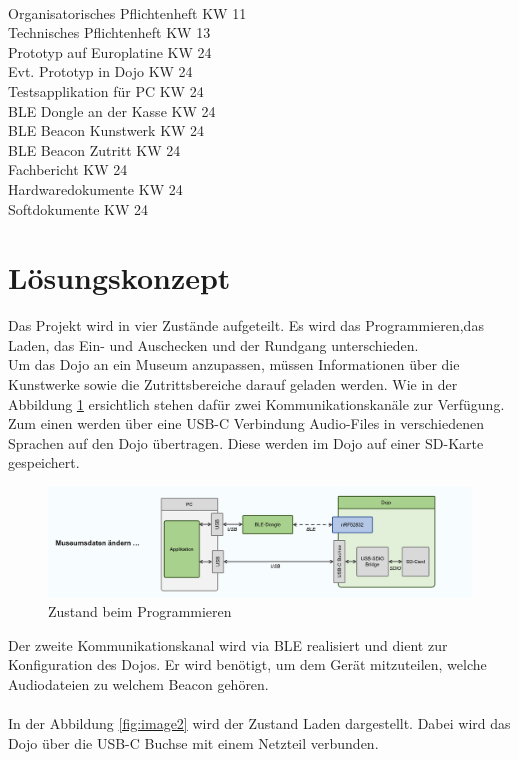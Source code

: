\documentclass[10pt,a4paper,oneside]{99_fhnwreport}
\begin{document}
\begin{tabbing}
\hspace{80mm}		\= 	\\ %
Organisatorisches Pflichtenheft		\>	KW 11 \\
Technisches Pflichtenheft		\>	KW 13 \\
Prototyp auf Europlatine		\>	KW 24 \\
Evt. Prototyp in Dojo			\>	KW 24 \\
Testsapplikation für PC			\>	KW 24 \\
BLE Dongle  an der Kasse			\>	KW 24 \\
BLE Beacon Kunstwerk			\>	KW 24 \\
BLE Beacon Zutritt			\>	KW 24 \\
Fachbericht				\>	KW 24 \\
Hardwaredokumente			\>	KW 24 \\
Softdokumente				\>	KW 24 \\
\end{tabbing}

\section{Lösungskonzept}\label{sec:konzept}

Das Projekt wird in vier Zustände aufgeteilt. Es wird das Programmieren,das Laden, das Ein- und Auschecken und der Rundgang unterschieden.\\
Um das Dojo an ein Museum anzupassen, müssen Informationen über die Kunstwerke sowie die Zutrittsbereiche darauf geladen werden. Wie in der Abbildung \ref{fig:image3} ersichtlich stehen dafür zwei Kommunikationskanäle zur Verfügung. Zum einen werden über eine USB-C Verbindung Audio-Files in verschiedenen Sprachen auf den Dojo übertragen. Diese werden im Dojo auf einer SD-Karte gespeichert.\\

\begin{figure}[htb]
\includegraphics[width=\textwidth]{Zustand_Programmieren.png}
\caption{Zustand beim Programmieren} %
\label{fig:image3}
\end{figure}
\newpage
Der zweite Kommunikationskanal wird via BLE realisiert und dient zur Konfiguration des Dojos. Er wird benötigt, um dem Gerät mitzuteilen, welche Audiodateien zu welchem Beacon gehören.\\
\\
In der Abbildung \ref{fig:image2} wird der Zustand Laden dargestellt. Dabei wird das Dojo über die USB-C Buchse mit einem Netzteil verbunden.
\end{document}
